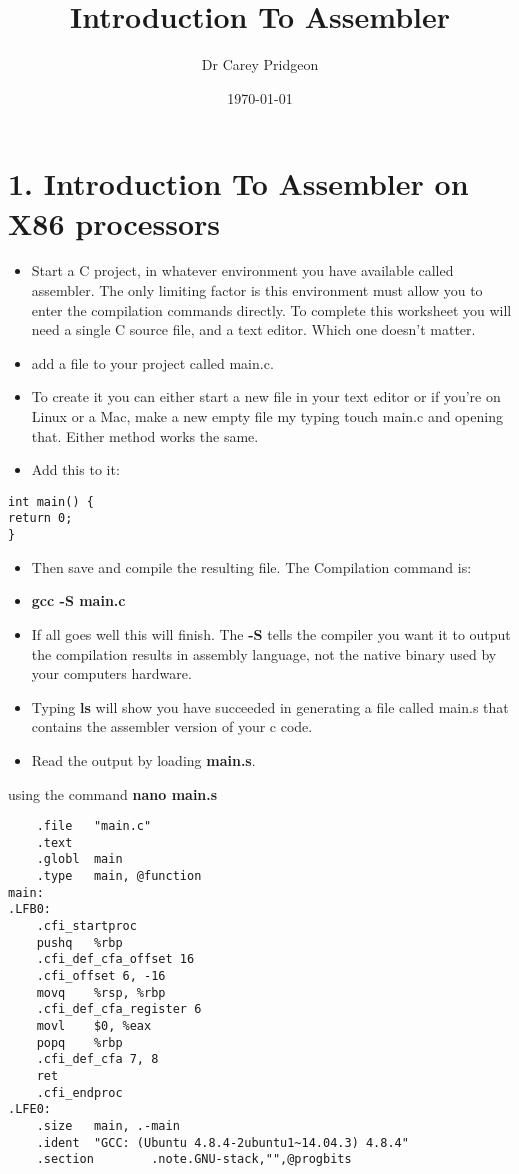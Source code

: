 \documentclass[minimal, t]{article}
\author{Dr Carey Pridgeon}
\date{\today}
\title{Introduction To Assembler}
\begin{document}
\maketitle
\section{1.         Introduction To Assembler on X86 processors}
\label{sec-1}

\begin{itemize}
\item Start a C project, in whatever environment you have available called
assembler. The only limiting factor is this environment must allow you to
enter the compilation commands directly. To complete this worksheet you will
need a single C source file, and a text editor. Which one doesn’t matter.

\item add a file to your project called main.c.
\item To create it you can either start a new file in your text editor or if you’re
on Linux or a Mac, make a new empty file my typing touch main.c and opening
that. Either method works the same.
\item Add this to it:
\end{itemize}
\begin{verbatim}
int main() {
return 0;
}
\end{verbatim}
\begin{itemize}
\item Then save and compile the resulting file. The Compilation command is:
\item \textbf{gcc -S main.c}
\item If all goes well this will finish.  The \textbf{-S} tells the compiler you want it to
output the compilation results in assembly language, not the native binary
used by your computers hardware.
\item Typing \textbf{ls} will show you have succeeded in generating a file called main.s
that contains the assembler version of your c code.
\item Read the output by loading \textbf{main.s}.
\end{itemize}
using the command \textbf{nano main.s}
\begin{verbatim}
	.file   "main.c"
	.text
	.globl  main
	.type   main, @function
main:
.LFB0:
	.cfi_startproc
	pushq   %rbp
	.cfi_def_cfa_offset 16
	.cfi_offset 6, -16
	movq    %rsp, %rbp
	.cfi_def_cfa_register 6
	movl    $0, %eax
	popq    %rbp
	.cfi_def_cfa 7, 8
	ret
	.cfi_endproc
.LFE0:
	.size   main, .-main
	.ident  "GCC: (Ubuntu 4.8.4-2ubuntu1~14.04.3) 4.8.4"
	.section        .note.GNU-stack,"",@progbits
\end{verbatim}
\end{document}
